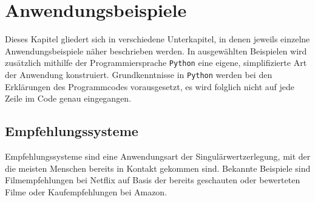 \chapter{Anwendungsbeispiele}   
Dieses Kapitel gliedert sich in verschiedene Unterkapitel, in denen jeweils einzelne Anwendungsbeispiele näher beschrieben werden.
In ausgewählten Beispielen wird zusätzlich mithilfe der Programmiersprache \texttt{Python} eine eigene, simplifizierte Art der Anwendung konstruiert.
Grundkenntnisse in \texttt{Python} werden bei den Erklärungen des Programmcodes vorausgesetzt, es wird folglich nicht auf jede Zeile im Code genau eingegangen.

\section{Empfehlungssysteme}

Empfehlungssysteme sind eine Anwendungsart der Singulärwertzerlegung, mit der die meisten Menschen bereits in Kontakt gekommen sind.
Bekannte Beispiele sind Filmempfehlungen bei Netflix auf Basis der bereits geschauten oder bewerteten Filme oder Kaufempfehlungen bei Amazon.


